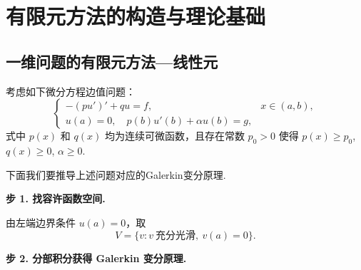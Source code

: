 \chapter{有限元方法的构造与理论基础}


\section{一维问题的有限元方法---线性元}


考虑如下微分方程边值问题：
\begin{equation}\label{eq:bvp}
\begin{cases}
-(pu')' + qu = f, & x \in (a,b), \\
u(a) = 0, \quad p(b)u'(b) + \alpha u(b) = g,
\end{cases}
\end{equation}
式中 $p(x)$ 和 $q(x)$ 均为连续可微函数，且存在常数 $p_0 > 0$ 使得 $p(x) \ge p_0$, $q(x) \ge 0$, $\alpha \ge 0$.\par
下面我们要推导上述问题对应的Galerkin变分原理.\par

\noindent\textbf{步 1. 找容许函数空间.}

由左端边界条件 $u(a)=0$，取
\begin{equation*}
    V = \{ v : v\ \text{充分光滑},\ v(a) = 0 \}.
\end{equation*}

\noindent\textbf{步 2. 分部积分获得 Galerkin 变分原理.}

